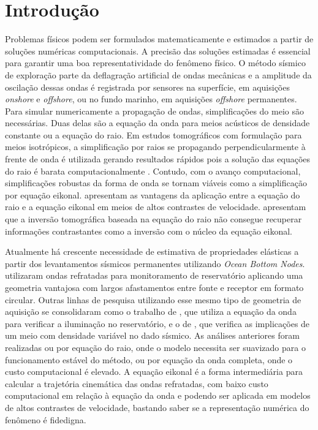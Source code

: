 \chapter{Introdução}
\label{ch:introducao}

Problemas físicos podem ser formulados matematicamente e estimados a partir de soluções numéricas computacionais. A precisão das soluções estimadas é essencial para garantir uma boa representatividade do fenômeno físico. O método sísmico de exploração parte da deflagração artificial de ondas mecânicas e a amplitude da oscilação dessas ondas é registrada por sensores na superfície, em aquisições \textit{onshore} e \textit{offshore}, ou no fundo marinho, em aquisições \textit{offshore} permanentes. Para simular numericamente a propagação de ondas, simplificações do meio são necessárias. Duas delas são a equação da onda para meios acústicos de densidade constante ou a equação do raio. Em estudos tomográficos com formulação para meios isotrópicos, a simplificação por raios se propagando perpendicularmente à frente de onda é utilizada gerando resultados rápidos pois a solução das equações do raio é barata computacionalmente \cite{zhang1998nonlinear}. Contudo, com o avanço computacional, simplificações robustas da forma de onda se tornam viáveis como a simplificação por equação eikonal.  apresentam as vantagens da aplicação entre a equação do raio e a equação eikonal em meios de altos contrastes de velocidade.  apresentam que a inversão tomográfica baseada na equação do raio não consegue recuperar informações contrastantes como a inversão com o núcleo da equação eikonal.  

Atualmente há crescente necessidade de estimativa de propriedades elásticas a partir dos levantamentos sísmicos permanentes utilizando \textit{Ocean Bottom Nodes}.  utilizaram ondas refratadas para monitoramento de reservatório aplicando uma geometria vantajosa com largos afastamentos entre fonte e receptor em formato circular. Outras linhas de pesquisa utilizando esse mesmo tipo de geometria de aquisição se consolidaram como o trabalho de , que utiliza a equação da onda para verificar a iluminação no reservatório, e o de , que verifica as implicações de um meio com densidade variável no dado sísmico. As análises anteriores foram realizadas ou por equação do raio, onde o modelo necessita ser suavizado para o funcionamento estável do método, ou por equação da onda completa, onde o custo computacional é elevado. A equação eikonal é a forma intermediária para calcular a trajetória cinemática das ondas refratadas, com baixo custo computacional em relação à equação da onda e podendo ser aplicada em modelos de altos contrastes de velocidade, bastando saber se a representação numérica do fenômeno é fidedigna. 

